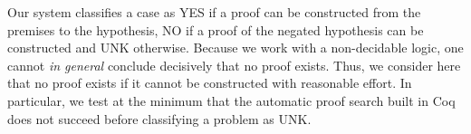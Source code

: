 \documentclass[11pt]{article}
\begin{document}
Our system classifies a case as YES if a proof can be constructed from
the premises to the hypothesis, NO if a proof of the negated
hypothesis can be constructed and UNK otherwise. Because we work with
a non-decidable logic, one cannot \emph{in general} conclude
decisively that no proof exists. Thus, we consider here that no proof
exists if it cannot be constructed with reasonable effort. In
particular, we test at the minimum that the automatic proof search
built in Coq does not succeed before classifying a problem as UNK.


\end{document}
